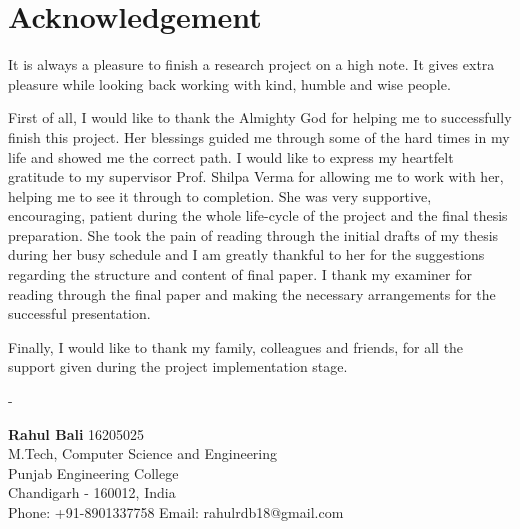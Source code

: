 \section*{Acknowledgement}
It is always a pleasure to finish a research project on a high note. It gives extra pleasure while looking back working with kind, humble and wise people. 

First of all, I would like to thank the Almighty God for helping me to successfully finish this project. Her blessings guided me through some of the hard times in my life and showed me the correct path. I would like to express my heartfelt gratitude to my supervisor Prof. Shilpa Verma for allowing me to work with her, helping me to see it through to completion. She was very supportive, encouraging, patient during the whole life-cycle of the project and the final thesis preparation. She took the pain of reading through the initial drafts of my thesis during her busy schedule and I am greatly thankful to her for the suggestions regarding the structure and content of final paper. I thank my examiner for reading through the final paper and making the necessary arrangements for the successful presentation.

Finally, I would like to thank my family, colleagues and friends, for all the support given during the project implementation stage.


\begin{minipage}{0.\textwidth}
-
\end{minipage}%
\begin{minipage}{0.5\textwidth}
\quad\quad\textbf{Rahul Bali} 16205025\\
M.Tech, Computer Science and Engineering\\
Punjab Engineering College\\
Chandigarh - 160012, India\\
Phone: +91-8901337758
Email: rahulrdb18@gmail.com 
\end{minipage}
